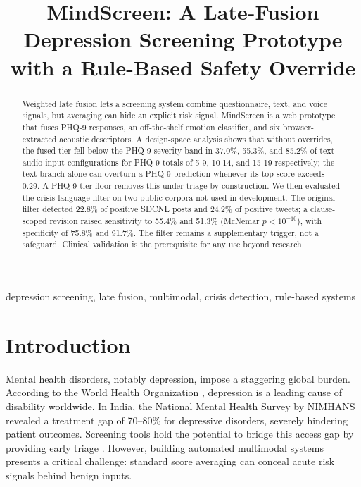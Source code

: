 \documentclass[conference]{IEEEtran}
\begin{document}
\title{MindScreen: A Late-Fusion Depression Screening Prototype with a Rule-Based Safety Override}

\author{
}

\maketitle

\begin{abstract}
Weighted late fusion lets a screening system combine questionnaire, text, and voice signals, but averaging can hide an explicit risk signal. MindScreen is a web prototype that fuses PHQ-9 responses, an off-the-shelf emotion classifier, and six browser-extracted acoustic descriptors. A design-space analysis shows that without overrides, the fused tier fell below the PHQ-9 severity band in 37.0\%, 55.3\%, and 85.2\% of text-audio input configurations for PHQ-9 totals of 5-9, 10-14, and 15-19 respectively; the text branch alone can overturn a PHQ-9 prediction whenever its top score exceeds 0.29. A PHQ-9 tier floor removes this under-triage by construction. We then evaluated the crisis-language filter on two public corpora not used in development. The original filter detected 22.8\% of positive SDCNL posts and 24.2\% of positive tweets; a clause-scoped revision raised sensitivity to 55.4\% and 51.3\% (McNemar $p < 10^{-10}$), with specificity of 75.8\% and 91.7\%. The filter remains a supplementary trigger, not a safeguard. Clinical validation is the prerequisite for any use beyond research.
\end{abstract}

\begin{IEEEkeywords}
depression screening, late fusion, multimodal, crisis detection, rule-based systems
\end{IEEEkeywords}

\section{Introduction}
Mental health disorders, notably depression, impose a staggering global burden. According to the World Health Organization \cite{who_depression}, depression is a leading cause of disability worldwide. In India, the National Mental Health Survey by NIMHANS \cite{nimhans_nmhs} revealed a treatment gap of 70--80\% for depressive disorders, severely hindering patient outcomes. Screening tools hold the potential to bridge this access gap by providing early triage \cite{sutton_cdss}. However, building automated multimodal systems presents a critical challenge: standard score averaging can conceal acute risk signals behind benign inputs.
\end{document}
